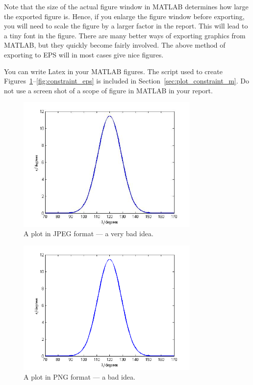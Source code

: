 Note that the size of the actual figure window in MATLAB determines how large the exported figure is. Hence, if you enlarge the figure window before exporting, you will need to scale the figure by a larger factor in the report. This will lead to a tiny font in the figure. There are many better ways of exporting graphics from MATLAB, but they quickly become fairly involved. The above method of exporting to EPS will in most cases give nice figures.

You can write Latex in your MATLAB figures. The script used to create Figures~\ref{fig:constraint_jpg}--\ref{fig:constraint_eps} is included in Section~\ref{sec:plot_constraint_m}. Do not use a screen shot of a scope of figure in MATLAB in your report.


\begin{figure}[htb]
	\centering
		\includegraphics[width=0.8\textwidth]{figures/constraint_jpg.jpg}
	\caption{A plot in JPEG format --- a very bad idea.}
	\label{fig:constraint_jpg}
\end{figure}

\begin{figure}[htb]
	\centering
		\includegraphics[width=0.8\textwidth]{figures/constraint_png.png}
	\caption{A plot in PNG format --- a bad idea.}
	\label{fig:constraint_png}
\end{figure}

